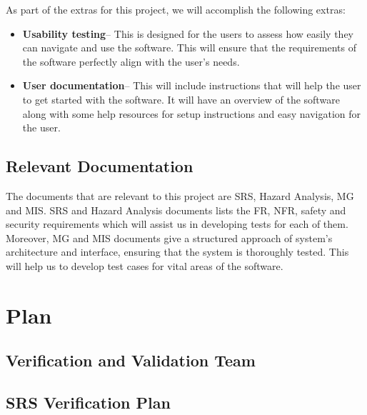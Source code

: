 \documentclass[12pt, titlepage]{article}
\begin{document}
As part of the extras for this project, we will accomplish the following extras:

\begin{itemize}
  \item\textbf{Usability testing}-- This is designed for the users to assess how easily they can navigate and use the software. This will ensure that the requirements of the software perfectly align with the user's needs.
  \item\textbf{User documentation}-- This will include instructions that will help the user to get started with the software. It will have an overview of the software along with some help resources for setup instructions and easy navigation for the user.
\end{itemize}

\subsection{Relevant Documentation}

The documents that are relevant to this project are SRS, Hazard Analysis, MG and MIS. SRS and Hazard Analysis documents lists the FR, NFR, safety and security requirements which will assist us in developing tests for each of them. Moreover, MG and MIS documents give a structured approach of system's architecture and interface, ensuring that the system is thoroughly tested. This will help us to develop test cases for vital areas of the software.  

\section{Plan}


\subsection{Verification and Validation Team}


\subsection{SRS Verification Plan}
\end{document}
